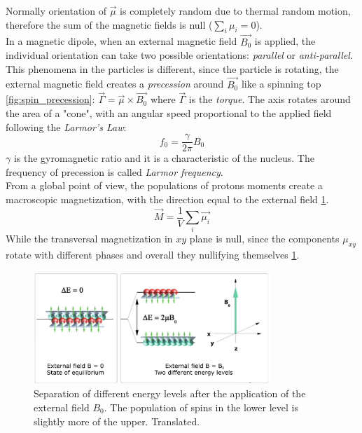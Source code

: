  \noindent Normally orientation of $\vec{\mu}$ is completely random due to thermal random motion, therefore the sum of the magnetic fields is null ($\sum_{i} \mu_{i} = 0$). \\
 In a magnetic dipole, when an external magnetic field $\vec{B_{0}}$ is applied, the individual orientation can take two possible orientations: \emph{parallel} or \emph{anti-parallel}. This phenomena in the particles is different, since the particle is rotating, the external magnetic field creates a \emph{precession} around $\vec{B_{0}}$ like a spinning top \ref{fig:spin_precession}: $\vec{\Gamma}=\vec{\mu} \times \vec{B_{0}}$ where $\vec{\Gamma}$ is the \emph{torque}. The axis rotates around the area of a "cone", with an angular speed proportional to the applied field following the \emph{Larmor's Law}:
 \begin{equation}
    f_{0}=\frac{\gamma}{2\pi} B_{0}
 \end{equation}
 $\gamma$ is the gyromagnetic ratio and it is a characteristic of the nucleus. The frequency of precession is called \emph{Larmor frequency}.\\
 From a global point of view, the populations of protons moments create a macroscopic magnetization, with the direction equal to the external field \ref{fig:macroscopic_magnetization}.
 \begin{equation}
    \vec{M}=\frac{1}{V}\sum_{i} \vec{\mu_{i}}
 \end{equation}
 While the transversal magnetization in $xy$ plane is null, since the components $\mu_{xy}$ rotate with different phases and overall they nullifying themselves \ref{fig:macroscopic_magnetization}.

 \begin{figure}[h]
    \centering
    \includegraphics[width=0.8\textwidth]{images/energy_protons.jpg}
    \caption{Separation of different energy levels after the application of the external field $B_0$. The population of spins in the lower level is slightly more of the upper.\cite{elementiRisonanza} Translated.}
    \label{fig:macroscopic_magnetization}
 \end{figure}

